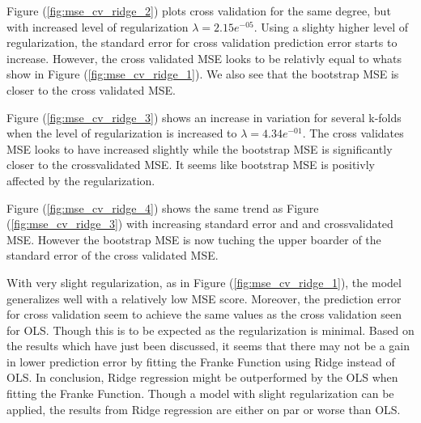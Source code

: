 \documentclass[11pt, a4paper]{article}
\begin{document}
Figure (\ref{fig:mse_cv_ridge_2}) plots cross validation for the same degree, but with increased level of regularization $\lambda = 2.15e^{-05}$. Using a slighty higher level of regularization, the standard error for cross validation prediction error starts to increase. However, the cross validated MSE looks to be relativly equal to whats show in Figure (\ref{fig:mse_cv_ridge_1}). We also see that the bootstrap MSE is closer to the cross validated MSE.

Figure (\ref{fig:mse_cv_ridge_3}) shows an increase in variation for several k-folds when the level of regularization is increased to $\lambda = 4.34e^{-01}$. The cross validates MSE looks to have increased slightly while the bootstrap MSE is significantly closer to the crossvalidated MSE. It seems like bootstrap MSE is positivly affected by the regularization.

Figure (\ref{fig:mse_cv_ridge_4}) shows the same trend as Figure (\ref{fig:mse_cv_ridge_3}) with increasing standard error and and crossvalidated MSE. However the bootstrap MSE is now tuching the upper boarder of the standard error of the cross validated MSE.

With very slight regularization, as in Figure (\ref{fig:mse_cv_ridge_1}), the model generalizes well with a relatively low MSE score. Moreover, the prediction error for cross validation seem to achieve the same values as the cross validation seen for OLS. Though this is to be expected as the regularization is minimal. Based on the results which have just been discussed, it seems that there may not be a gain in lower prediction error by fitting the Franke Function using Ridge instead of OLS. In conclusion, Ridge regression might be outperformed by the OLS when fitting the Franke Function. Though a model with slight regularization can be applied, the results from Ridge regression are either on par or worse than OLS.


\end{document}
